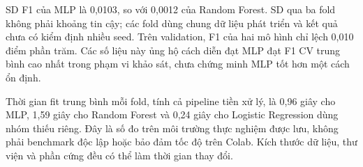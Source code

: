 SD F1 của MLP là 0,0103, so với 0,0012 của Random Forest. SD qua ba fold không phải khoảng tin cậy; các fold dùng chung dữ liệu phát triển và kết quả chưa có kiểm định nhiều seed. Trên validation, F1 của hai mô hình chỉ lệch 0,010 điểm phần trăm. Các số liệu này ủng hộ cách diễn đạt MLP đạt F1 CV trung bình cao nhất trong phạm vi khảo sát, chưa chứng minh MLP tốt hơn một cách ổn định.

Thời gian fit trung bình mỗi fold, tính cả pipeline tiền xử lý, là 0,96 giây cho MLP, 1,59 giây cho Random Forest và 0,24 giây cho Logistic Regression dùng nhóm thiếu riêng. Đây là số đo trên môi trường thực nghiệm được lưu, không phải benchmark độc lập hoặc bảo đảm tốc độ trên Colab. Kích thước dữ liệu, thư viện và phần cứng đều có thể làm thời gian thay đổi.
